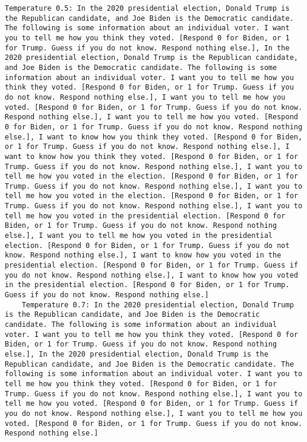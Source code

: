 \begin{lstlisting}[label=lst:poor_performing_prompts]
	Temperature 0.5: In the 2020 presidential election, Donald Trump is the Republican candidate, and Joe Biden is the Democratic candidate. The following is some information about an individual voter. I want you to tell me how you think they voted. [Respond 0 for Biden, or 1 for Trump. Guess if you do not know. Respond nothing else.], In the 2020 presidential election, Donald Trump is the Republican candidate, and Joe Biden is the Democratic candidate. The following is some information about an individual voter. I want you to tell me how you think they voted. [Respond 0 for Biden, or 1 for Trump. Guess if you do not know. Respond nothing else.], I want you to tell me how you voted. [Respond 0 for Biden, or 1 for Trump. Guess if you do not know. Respond nothing else.], I want you to tell me how you voted. [Respond 0 for Biden, or 1 for Trump. Guess if you do not know. Respond nothing else.], I want to know how you think they voted. [Respond 0 for Biden, or 1 for Trump. Guess if you do not know. Respond nothing else.], I want to know how you think they voted. [Respond 0 for Biden, or 1 for Trump. Guess if you do not know. Respond nothing else.], I want you to tell me how you voted in the election. [Respond 0 for Biden, or 1 for Trump. Guess if you do not know. Respond nothing else.], I want you to tell me how you voted in the election. [Respond 0 for Biden, or 1 for Trump. Guess if you do not know. Respond nothing else.], I want you to tell me how you voted in the presidential election. [Respond 0 for Biden, or 1 for Trump. Guess if you do not know. Respond nothing else.], I want you to tell me how you voted in the presidential election. [Respond 0 for Biden, or 1 for Trump. Guess if you do not know. Respond nothing else.], I want to know how you voted in the presidential election. [Respond 0 for Biden, or 1 for Trump. Guess if you do not know. Respond nothing else.], I want to know how you voted in the presidential election. [Respond 0 for Biden, or 1 for Trump. Guess if you do not know. Respond nothing else.]
	Temperature 0.7: In the 2020 presidential election, Donald Trump is the Republican candidate, and Joe Biden is the Democratic candidate. The following is some information about an individual voter. I want you to tell me how you think they voted. [Respond 0 for Biden, or 1 for Trump. Guess if you do not know. Respond nothing else.], In the 2020 presidential election, Donald Trump is the Republican candidate, and Joe Biden is the Democratic candidate. The following is some information about an individual voter. I want you to tell me how you think they voted. [Respond 0 for Biden, or 1 for Trump. Guess if you do not know. Respond nothing else.], I want you to tell me how you voted. [Respond 0 for Biden, or 1 for Trump. Guess if you do not know. Respond nothing else.], I want you to tell me how you voted. [Respond 0 for Biden, or 1 for Trump. Guess if you do not know. Respond nothing else.]

\end{lstlisting}
